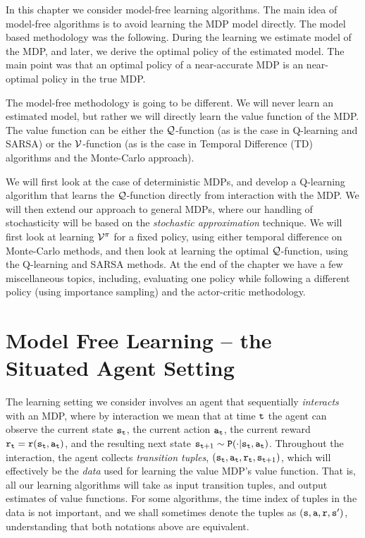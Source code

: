 In this chapter we consider model-free learning algorithms. The main
idea of model-free algorithms is to avoid learning the MDP model
directly. The model based methodology was the following. During the
learning we estimate model of the MDP, and later,  we derive the
optimal policy of the estimated model. The main point was that an
optimal policy of a near-accurate MDP is an near-optimal policy in
the true MDP.

The model-free methodology is going to be different. We will never
learn an estimated model, but rather we will directly learn the
value function of the MDP. The value function can be either the
$\mathcal{Q}$-function (as is the case in Q-learning and SARSA) or the
$\mathcal{V}$-function (as is the case in Temporal Difference (TD) algorithms
and the Monte-Carlo approach).

We will first look at the case of deterministic MDPs, and develop a Q-learning algorithm that learns the $\mathcal{Q}$-function directly from interaction with the MDP. We will then extend our approach to general MDPs, where our handling of stochasticity will be based on the \textit{stochastic approximation} technique. We will first look at learning $\mathcal{V}^{\pi}$ for a fixed policy, using either temporal difference on Monte-Carlo methods, and then look at learning the optimal $\mathcal{Q}$-function, using the Q-learning and SARSA methods. At the end of the chapter we have a few miscellaneous topics, including,
evaluating one policy while following a different policy (using
importance sampling) and the actor-critic methodology.

\section{Model Free Learning -- the Situated Agent Setting}

The learning setting we consider involves an agent that sequentially \textit{interacts} with an MDP, where by interaction we mean that at time ${\tt t}$ the agent can observe the current state ${\tt s}_{{\tt t}}$, the current action ${\tt a}_{{\tt t}}$, the current reward ${\tt r}_{{\tt t}} = {\tt r}({\tt s}_{{\tt t}},{\tt a}_{{\tt t}})$, and the resulting next state ${\tt s}_{{\tt t}+1} \sim {\tt P}(\cdot | {\tt s}_{{\tt t}},{\tt a}_{{\tt t}})$. Throughout the interaction, the agent collects \textit{transition tuples}, $\left({\tt s}_{{\tt t}}, {\tt a}_{{\tt t}}, {\tt r}_{{\tt t}}, {\tt s}_{{\tt t}+1} \right)$, which will effectively be the \textit{data} used for learning the value MDP's value function. That is, all our learning algorithms will take as input transition tuples, and output estimates of value functions. For some algorithms, the time index of tuples in the data is not important, and we shall sometimes denote the tuples as $\left({\tt s}, {\tt a}, {\tt r}, {\tt s}' \right)$, understanding that both notations above are equivalent.

